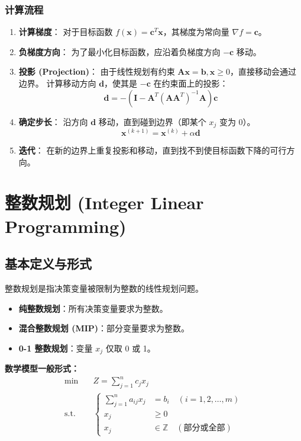 \documentclass[a4paper,12pt]{ctexart} %
\begin{document}
	\subsubsection*{计算流程}
	\begin{enumerate}
		\item \textbf{计算梯度}：
		对于目标函数 $f(\bm{x}) = \bm{c}^T \bm{x}$，其梯度为常向量 $\nabla f = \bm{c}$。
		\item \textbf{负梯度方向}：
		为了最小化目标函数，应沿着负梯度方向 $-\bm{c}$ 移动。
		\item \textbf{投影 (Projection)}：
		由于线性规划有约束 $\bm{A}\bm{x}=\bm{b}, \bm{x} \geq 0$，直接移动会通过边界。
		计算移动方向 $\bm{d}$，使其是 $-\bm{c}$ 在约束面上的投影：
		$$ \bm{d} = - (\bm{I} - \bm{A}^T(\bm{A}\bm{A}^T)^{-1}\bm{A}) \bm{c} $$
		\item \textbf{确定步长}：
		沿方向 $\bm{d}$ 移动，直到碰到边界（即某个 $x_j$ 变为 0）。
		$$ \bm{x}^{(k+1)} = \bm{x}^{(k)} + \alpha \bm{d} $$
		\item \textbf{迭代}：
		在新的边界上重复投影和移动，直到找不到使目标函数下降的可行方向。
	\end{enumerate}
	
	
	\section{整数规划 (Integer Linear Programming)}
	
	\subsection{基本定义与形式}
	
	整数规划是指决策变量被限制为整数的线性规划问题。
	\begin{itemize}
		\item \textbf{纯整数规划}：所有决策变量要求为整数。
		\item \textbf{混合整数规划 (MIP)}：部分变量要求为整数。
		\item \textbf{0-1 整数规划}：变量 $x_j$ 仅取 0 或 1。
	\end{itemize}
	
	\textbf{数学模型一般形式：}
	\begin{equation}
		\begin{aligned}
			\min \quad & Z = \sum_{j=1}^{n} c_j x_j \\
			\text{s.t.} \quad & \left\{
			\begin{aligned}
				\sum_{j=1}^{n} a_{ij} x_j &= b_i \quad (i = 1, 2, \dots, m) \\
				x_j &\ge 0 \\
				x_j & \in \mathbb{Z} \quad (\text{部分或全部})
			\end{aligned}
			\right.
		\end{aligned}
	\end{equation}
	
\end{document}
